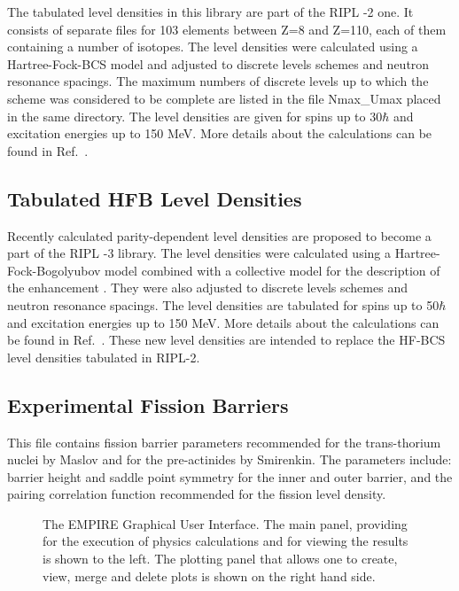 The tabulated level densities%
 in this library are part of the RIPL%
-2 one. It consists of separate files for 103 elements
between Z=8 and Z=110, each of them containing a number of isotopes. The
level densities were calculated using a Hartree-Fock-BCS model and adjusted to
discrete levels schemes and neutron resonance spacings. The maximum numbers
of discrete levels up to which the scheme was considered to be complete are
listed in the file Nmax\_Umax placed in the same directory. The level
densities are given for spins up to 30$\hbar $ and excitation energies up to
150 MeV. More details about the calculations can be found in Ref.~\cite%
{HFBCS}.

\subsection{Tabulated HFB Level Densities}

Recently calculated parity-dependent level densities%
 are proposed to become a part of the RIPL%
-3 library. The level densities were calculated using a
Hartree-Fock-Bogolyubov model combined with a collective model for the
description of the enhancement \cite{higo06}. They were also adjusted to
discrete levels schemes and neutron resonance spacings. The level densities
are tabulated for spins up to 50$\hbar $ and excitation energies up to 150
MeV. More details about the calculations can be found in Ref.~\cite{higo06}.
These new level densities are intended to replace the HF-BCS level densities
tabulated in RIPL-2.

\subsection{Experimental Fission Barriers}

This file contains
fission barrier parameters recommended for the trans-thorium nuclei by
Maslov and for the pre-actinides by Smirenkin. The parameters include: barrier
height and saddle point symmetry for the inner and outer barrier, and the
pairing correlation function recommended for the fission level density.

\begin{figure*}[htbp]
 
\caption{The EMPIRE Graphical User Interface. The main panel, providing for
the execution of physics calculations and for viewing the results is
shown to the left. The plotting panel that allows one to create, view, merge
and delete plots is shown on the right hand side.}
\label{fig:GUI}
\end{figure*}

